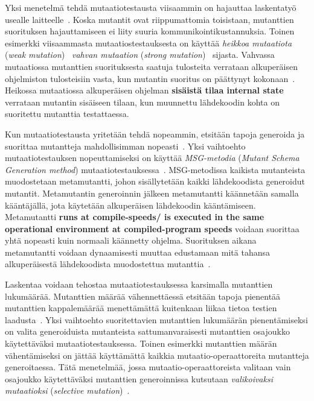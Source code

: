 \documentclass[finnish, grading]{tktltiki2}
\theoremstyle{definition}
\theoremstyle{remark}
\begin{document}
Yksi menetelmä tehdä mutaatiotestausta viisaammin on hajauttaa laskentatyö usealle laitteelle~\cite[s. 38]{Offutt:Untch:2001}. Koska mutantit ovat riippumattomia toisistaan, mutanttien suorituksen hajauttamiseen ei liity suuria kommunikointikustannuksia. Toinen esimerkki viisaammasta mutaatiostestauksesta on käyttää \textit{heikkoa mutaatiota} (\textit{weak mutation})~\cite[s. 37]{Offutt:Untch:2001} \textit{vahvan mutaation} (\textit{strong mutation})~\cite[s. 655]{Jia:Harman:2011} sijasta. Vahvassa mutaatiossa mutanttien suorituksesta saatuja tulosteita verrataan alkuperäisen ohjelmiston tulosteisiin vasta, kun mutantin suoritus on päättynyt kokonaan~\cite[s. 37]{Offutt:Untch:2001}. Heikossa mutaatiossa alkuperäisen ohjelman \textbf{sisäistä tilaa internal state} verrataan mutantin sisäiseen tilaan, kun muunnettu lähdekoodin kohta on suoritettu mutanttia testattaessa.

Kun mutaatiotestausta yritetään tehdä nopeammin, etsitään tapoja generoida ja suorittaa mutantteja mahdollisimman nopeasti~\cite[s. 37]{Offutt:Untch:2001}. Yksi vaihtoehto mutaatiotestauksen nopeuttamiseksi on käyttää \textit{MSG-metodia} (\textit{Mutant Schema Generation method}) mutaatiotestauksessa~\cite[s. 38]{Offutt:Untch:2001}. MSG-metodissa kaikista mutanteista muodostetaan metamutantti, johon sisällytetään kaikki lähdekoodista generoidut mutantit. Metamutantin generoinnin jälkeen metamutantti käännetään samalla kääntäjällä, jota käytetään alkuperäisen lähdekoodin kääntämiseen. Metamutantti \textbf{runs at compile-speeds/ is executed in the same operational environment at com\-pi\-led-prog\-ram speeds} voidaan suorittaa yhtä nopeasti kuin normaali käännetty ohjelma. Suorituksen aikana metamutantti voidaan dynaamisesti muuttaa edustamaan mitä tahansa alkuperäisestä lähdekoodista muodostettua mutanttia~\cite[s. 105]{Ma:Offutt:Kwon:2005:MuAutomated}.

Laskentaa voidaan tehostaa mutaatiotestauksessa karsimalla mutanttien lukumäärää. Mutanttien määrää vähennettäessä etsitään tapoja pienentää mutanttien kappalemäärää menettämättä kuitenkaan liikaa tietoa testien laadusta~\cite[s. 37]{Offutt:Untch:2001}. Yksi vaihtoehto suoritettavien mutanttien lukumäärän pienentämiseksi on valita generoiduista mutanteista sattumanvaraisesti mutanttien osajoukko käytettäväksi mutaatiotestauksessa. Toinen esimerkki mutanttien määrän vähentämiseksi on jättää käyttämättä kaikkia mutaatio-operaattoreita mutantteja generoitaessa. Tätä menetelmää, jossa mutaatio-operaattoreista valitaan vain osajoukko käytettäväksi mutanttien generoinnissa kutsutaan \textit{valikoivaksi mutaatioksi} (\textit{selective mutation})~\cite[s. 37]{Offutt:Untch:2001}.
\end{document}
